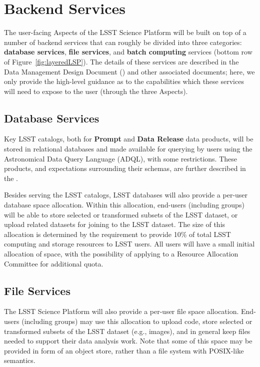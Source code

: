 \section{Backend Services\label{sec:backend}}

The user-facing Aspects of the LSST Science Platform will be built on top of a number of backend services that can roughly be divided into three categories: \textbf{database services}, \textbf{file services}, and \textbf{batch computing} services (bottom row of Figure~\ref{fig:layeredLSP}).
The details of these services are described in the Data Management Design Document () and other associated documents; here, we only provide the high-level guidance as to the capabilities which these services will need to expose to the user (through the three Aspects).

\subsection{Database Services}

Key LSST catalogs, both for \textbf{Prompt} and \textbf{Data Release} data products, will be stored in relational databases and made available for querying by users using
the Astronomical Data Query Language (ADQL), with some restrictions.
These products, and expectations surrounding their schemas, are further described in the \DPDD.

Besides serving the LSST catalogs, LSST databases will also provide a per-user database space allocation.
Within this allocation, end-users (including groups) will be able to store selected or transformed subsets of the LSST dataset, or upload related datasets for joining to the LSST dataset.
The size of this allocation is determined by the \SRD requirement to provide 10\% of total LSST computing and storage resources to LSST users.
All users will have a small initial allocation of space, with the possibility of applying to a Resource Allocation Committee for additional quota.

\subsection{File Services}

The LSST Science Platform will also provide a per-user file space allocation.
End-users (including groups) may use this allocation to upload code, store selected or transformed subsets of the LSST dataset (e.g., images), and in general keep files needed to support their data analysis work.
Note that some of this space may be provided in form of an object store, rather than a file system with POSIX-like semantics.

